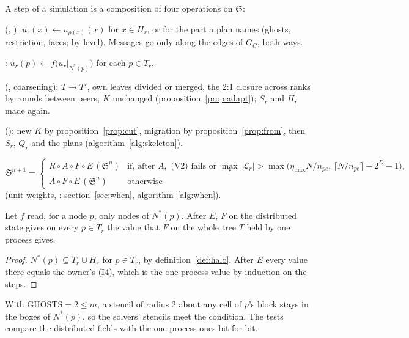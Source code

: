 A step of a simulation is a composition of four operations on
$\mathfrak{S}$:
\begin{description}[leftmargin=1.4em, font=\normalfont\itshape]
  \item[Exchange $E$] (, ):
    $u_r(x) \gets u_{\rho(x)}(x)$ for $x \in H_r$, or for the part a plan
    names (ghosts, restriction, faces; by level). Messages go only along
    the edges of $G_C$, both ways.
  \item[Compute $F$]: $u_r(p) \gets f\big(u_r|_{N^*(p)}\big)$ for each $p
    \in T_r$.
  \item[Adapt $A$] (, coarsening): $T \to T'$, own
    leaves divided or merged, the 2:1 closure across ranks by rounds
    between peers; $K$ unchanged (proposition~\ref{prop:adapt}); $S_r$ and
    $H_r$ made again.
  \item[Repartition $R$] (): new $K$ by
    proposition~\ref{prop:cut}, migration by proposition~\ref{prop:from},
    then $S_r$, $Q_r$ and the plans (algorithm~\ref{alg:skeleton}).
\end{description}
\[
  \mathfrak{S}^{n+1} = \begin{cases}
    R \circ A \circ F \circ E\,(\mathfrak{S}^n) & \text{if, after } A,
      \text{ (V2) fails or } \max_r |\mathcal{L}_r| > \max\big(
      \eta_{\max} N/n_{pe},\, \lceil N/n_{pe} \rceil + 2^D - 1\big),\\
    A \circ F \circ E\,(\mathfrak{S}^n) & \text{otherwise}
  \end{cases}
\]
(unit weights, : section~\ref{sec:when},
algorithm~\ref{alg:when}).

\begin{proposition}
  \label{prop:serial}
  Let $f$ read, for a node $p$, only nodes of $N^*(p)$. After $E$, $F$ on
  the distributed state gives on every $p \in T_r$ the value that $F$ on
  the whole tree $T$ held by one process gives.
\end{proposition}

\begin{proof}
  $N^*(p) \subseteq T_r \cup H_r$ for $p \in T_r$, by
  definition~\ref{def:halo}. After $E$ every value there equals the
  owner's (I4), which is the one-process value by induction on the steps.
\end{proof}

With $\mathrm{GHOSTS} = 2 \le m$, a stencil of radius 2 about any cell of
$p$'s block stays in the boxes of $N^*(p)$, so the solvers' stencils meet
the condition. The tests compare the distributed fields with the
one-process ones bit for bit.

